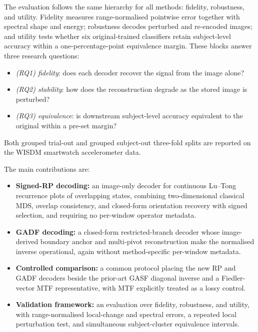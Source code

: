 \documentclass[preprint,12pt]{elsarticle}
\begin{document}
The evaluation follows the same hierarchy for all methods: fidelity, robustness, and utility. Fidelity measures range-normalised pointwise error together with spectral shape and energy; robustness decodes perturbed and re-encoded images; and utility tests whether six original-trained classifiers retain subject-level accuracy within a one-percentage-point equivalence margin. These blocks answer three research questions:
\begin{itemize}
    \item \emph{(RQ1) fidelity}: does each decoder recover the signal from the image alone?
    \item \emph{(RQ2) stability}: how does the reconstruction degrade as the stored image is perturbed?
    \item \emph{(RQ3) equivalence}: is downstream subject-level accuracy equivalent to the original within a pre-set margin?
\end{itemize}
Both grouped trial-out and grouped subject-out three-fold splits are reported on the WISDM smartwatch accelerometer data.

The main contributions are:
\begin{itemize}
    \item \textbf{Signed-RP decoding:} an image-only decoder for continuous Lu--Tong recurrence plots of overlapping states, combining two-dimensional classical MDS, overlap consistency, and closed-form orientation recovery with signed selection, and requiring no per-window operator metadata.
    \item \textbf{GADF decoding:} a closed-form restricted-branch decoder whose image-derived boundary anchor and multi-pivot reconstruction make the normalised inverse operational, again without method-specific per-window metadata.
    \item \textbf{Controlled comparison:} a common protocol placing the new RP and GADF decoders beside the prior-art GASF diagonal inverse and a Fiedler-vector MTF representative, with MTF explicitly treated as a lossy control.
    \item \textbf{Validation framework:} an evaluation over fidelity, robustness, and utility, with range-normalised local-change and spectral errors, a repeated local perturbation test, and simultaneous subject-cluster equivalence intervals.
\end{itemize}
\end{document}

